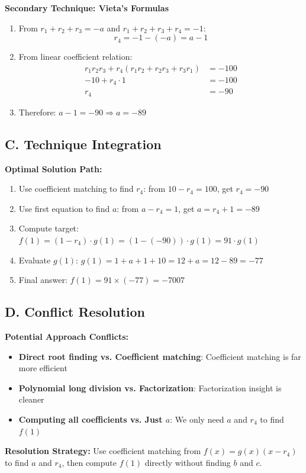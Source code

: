 \documentclass[]{article}
\begin{document}
\begin{techniquesbox}
\textbf{Secondary Technique: Vieta's Formulas}
\begin{enumerate}[leftmargin=*]
    \item From $r_1 + r_2 + r_3 = -a$ and $r_1 + r_2 + r_3 + r_4 = -1$:
    \[r_4 = -1 - (-a) = a - 1\]
    
    \item From linear coefficient relation:
    \begin{align*}
        r_1r_2r_3 + r_4(r_1r_2 + r_2r_3 + r_3r_1) &= -100 \\
        -10 + r_4 \cdot 1 &= -100 \\
        r_4 &= -90
    \end{align*}
    
    \item Therefore: $a - 1 = -90 \Rightarrow a = -89$
\end{enumerate}

\subsection*{C. Technique Integration}

\textbf{Optimal Solution Path:}
\begin{enumerate}[leftmargin=*]
    \item Use coefficient matching to find $r_4$: from $10 - r_4 = 100$, get $r_4 = -90$
    \item Use first equation to find $a$: from $a - r_4 = 1$, get $a = r_4 + 1 = -89$
    \item Compute target: $f(1) = (1 - r_4) \cdot g(1) = (1-(-90)) \cdot g(1) = 91 \cdot g(1)$
    \item Evaluate $g(1)$: $g(1) = 1 + a + 1 + 10 = 12 + a = 12 - 89 = -77$
    \item Final answer: $f(1) = 91 \times (-77) = -7007$
\end{enumerate}

\subsection*{D. Conflict Resolution}

\textbf{Potential Approach Conflicts:}
\begin{itemize}[leftmargin=*]
    \item \textbf{Direct root finding vs. Coefficient matching}: Coefficient matching is far more efficient
    \item \textbf{Polynomial long division vs. Factorization}: Factorization insight is cleaner
    \item \textbf{Computing all coefficients vs. Just $a$}: We only need $a$ and $r_4$ to find $f(1)$
\end{itemize}

\textbf{Resolution Strategy:} Use coefficient matching from $f(x) = g(x)(x-r_4)$ to find $a$ and $r_4$, then compute $f(1)$ directly without finding $b$ and $c$.
\end{techniquesbox}
\end{document}
